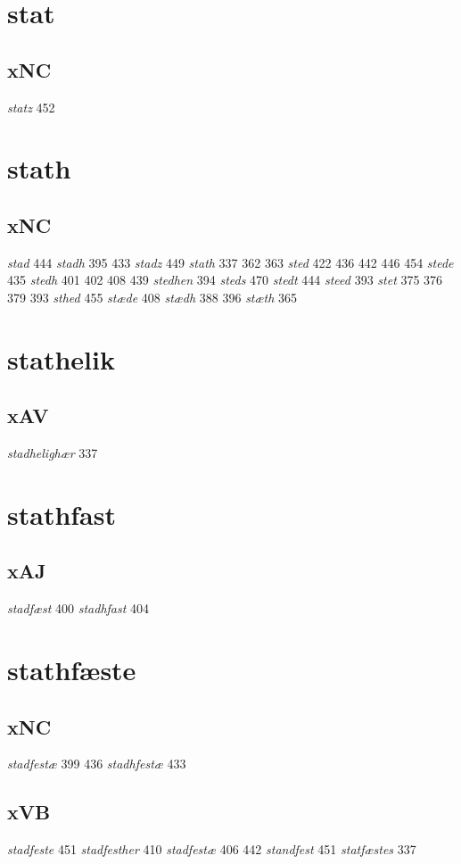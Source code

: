 \documentclass[a4paper,twocolumn]{article}
\begin{document}
\section{stat}
\label{sec:org95e40fa}
\subsection{xNC}
\label{sec:org7859f3b}
\emph{statz} 452 
\section{stath}
\label{sec:org0b26cc1}
\subsection{xNC}
\label{sec:org3446d63}
\emph{stad} 444 \emph{stadh} 395 433 \emph{stadz} 449 \emph{stath} 337 362 363 \emph{sted} 422 436 442 446 454 \emph{stede} 435 \emph{stedh} 401 402 408 439 \emph{stedhen} 394 \emph{steds} 470 \emph{stedt} 444 \emph{steed} 393 \emph{stet} 375 376 379 393 \emph{sthed} 455 \emph{stæde} 408 \emph{stædh} 388 396 \emph{stæth} 365 
\section{stathelik}
\label{sec:org4330f4a}
\subsection{xAV}
\label{sec:org5f22ed4}
\emph{stadhelighær} 337 
\section{stathfast}
\label{sec:org4dfabe6}
\subsection{xAJ}
\label{sec:orgeb825a3}
\emph{stadfæst} 400 \emph{stadhfast} 404 
\section{stathfæste}
\label{sec:org3f21d01}
\subsection{xNC}
\label{sec:orge43675d}
\emph{stadfestæ} 399 436 \emph{stadhfestæ} 433 
\subsection{xVB}
\label{sec:org6312a29}
\emph{stadfeste} 451 \emph{stadfesther} 410 \emph{stadfestæ} 406 442 \emph{standfest} 451 \emph{statfæstes} 337 
\end{document}
